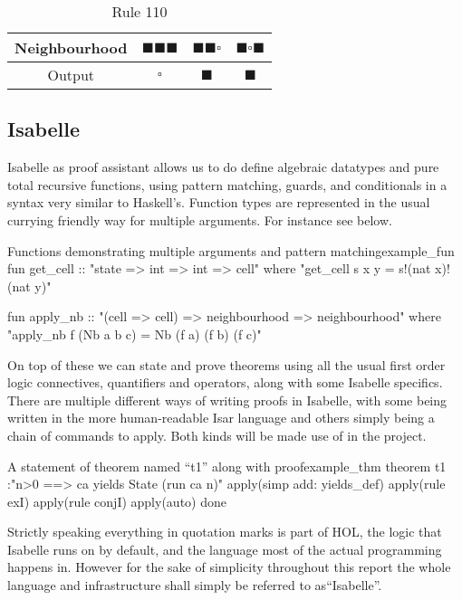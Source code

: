 \begin{table}[htbp]
    \centering
    \begin{tabular}{c|ccc}
        Neighbourhood & $\blacksquare \blacksquare \blacksquare$ & $\blacksquare \blacksquare \square$ & $\blacksquare \square \blacksquare$  \\
         \hline
         Output & $\square$ & $\blacksquare$ & $\blacksquare$
    \end{tabular}
    \caption{Rule 110}
    \label{table:rule110}
\end{table}


\subsection{Isabelle}

Isabelle as proof assistant allows us to do define algebraic datatypes and pure total recursive functions,
using pattern matching, guards, and conditionals in a syntax very similar to Haskell's.
Function types are represented in the usual currying friendly way for multiple arguments.
For instance see  below.

\begin{myminted}{Functions demonstrating multiple arguments and pattern matching}{example_fun}
    fun get_cell :: "state => int => int => cell" where
    "get_cell s x y = s!(nat x)!(nat y)"

    fun apply_nb :: "(cell => cell) => neighbourhood => neighbourhood" where
    "apply_nb f (Nb a b c) = Nb (f a) (f b) (f c)"
\end{myminted}

On top of these we can state and prove theorems using all the usual first order logic connectives, quantifiers and operators,
along with some Isabelle specifics.
There are multiple different ways of writing proofs in Isabelle,
with some being written in the more human-readable Isar language
and others simply being a chain of commands to apply.
Both kinds will be made use of in the project.

\begin{myminted}{A statement of theorem named ``t1'' along with proof}{example_thm}
    theorem t1 :"n>0 ==> ca yields State (run ca n)"
      apply(simp add: yields_def)
      apply(rule exI)
      apply(rule conjI)
      apply(auto)
      done
\end{myminted}

Strictly speaking everything in quotation marks is part of HOL,
the logic that Isabelle runs on by default,
and the language most of the actual programming happens in.
However for the sake of simplicity throughout this report the whole language and infrastructure shall simply be referred to as``Isabelle''.
